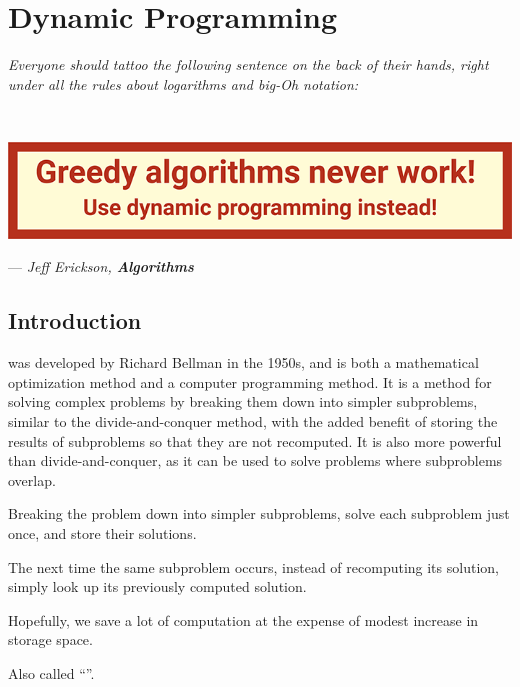 \chapter{Dynamic Programming}
\vspace{-1em}
\begin{center}
    \begin{minipage}[t]{0.8\linewidth}
        \textit{Everyone should tattoo the following sentence on the back of their hands, right under all the rules about logarithms and big-Oh notation:}
    \end{minipage}

    {~~~}

    \vspace{0.5em}
    \includegraphics[width=0.45\linewidth]{figures/greedy-never-works.png}
    \begin{flushright}
        --- \textit{Jeff Erickson, \textbf{Algorithms}}
    \end{flushright}
\end{center}

\section{Introduction}

 was developed by Richard Bellman in the 1950s, and is both a mathematical optimization method and a computer programming method. It is a method for solving complex problems by breaking them down into simpler subproblems, similar to the divide-and-conquer method, with the added benefit of storing the results of subproblems so that they are not recomputed. It is also more powerful than divide-and-conquer, as it can be used to solve problems where subproblems overlap.

\begin{listu}
    \item Breaking the problem down into simpler subproblems, solve each subproblem just once, and store their solutions. 
    \item The next time the same subproblem occurs, instead of recomputing its solution, simply look up its previously computed solution.
    \item Hopefully, we save a lot of computation at the expense of modest increase in storage space. 
    \item Also called ``''.
\end{listu}

